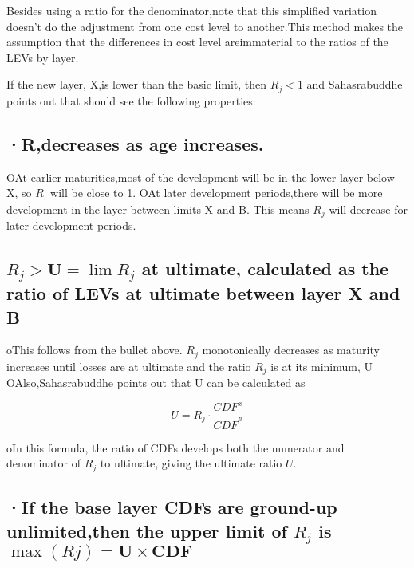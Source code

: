 \documentclass[
]{article}
\begin{document}
Besides using a ratio for the denominator,note that this simplified
variation doesn't do the adjustment from one cost level to another.This
method makes the assumption that the differences in cost level
areimmaterial to the ratios of the LEVs by layer.

If the new layer, X,is lower than the basic limit, then \(R_{j}<1\) and
Sahasrabuddhe points out that should see the following properties:

\subsection{·R,decreases as age
increases.}\label{rdecreases-as-age-increases.}

OAt earlier maturities,most of the development will be in the lower
layer below X, so \(R_{,}\) will be close to 1. OAt later development
periods,there will be more development in the layer between limits X and
B. This means \(R_{j}\) will decrease for later development periods.

\subsection{\texorpdfstring{\(R_{j}>\mathbf{U}=\lim R_{j}\) at ultimate,
calculated as the ratio of LEVs at ultimate between layer X and
B}{R\_\{j\}\textgreater\textbackslash mathbf\{U\}=\textbackslash lim R\_\{j\} at ultimate, calculated as the ratio of LEVs at ultimate between layer X and B}}\label{r_jmathbfulim-r_j-at-ultimate-calculated-as-the-ratio-of-levs-at-ultimate-between-layer-x-and-b}

oThis follows from the bullet above. \(R_{j}\) monotonically decreases
as maturity increases until losses are at ultimate and the ratio
\(R_{j}\) is at its minimum, U OAlso,Sahasrabuddhe points out that U can
be calculated as

\[U=R_{j}\cdot\frac{CDF^{x}}{CDF^{^B}}\]

oIn this formula, the ratio of CDFs develops both the numerator and
denominator of \(R_{j}\) to ultimate, giving the ultimate ratio \(U.\)

\subsection{\texorpdfstring{·If the base layer CDFs are ground-up
unlimited,then the upper limit of \(R_{j}\) is
\(\max(Rj)=\mathbf{U}\times\mathbf{CDF}\)}{·If the base layer CDFs are ground-up unlimited,then the upper limit of R\_\{j\} is \textbackslash max(Rj)=\textbackslash mathbf\{U\}\textbackslash times\textbackslash mathbf\{CDF\}}}\label{if-the-base-layer-cdfs-are-ground-up-unlimitedthen-the-upper-limit-of-r_j-is-maxrjmathbfutimesmathbfcdf}
\end{document}
